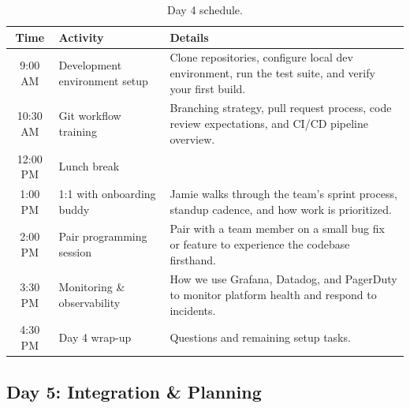 \documentclass[
    language=english,
    doctype=onboarding-guide,
    institution=none,
]{../../omnilatex}
\begin{document}
\begin{table}[h]
    \centering
    \begin{tabular}{clp{7cm}}
        \toprule
        \textbf{Time} & \textbf{Activity} & \textbf{Details} \\
        \midrule
        9:00 AM  & Development environment setup & Clone repositories, configure
            local dev environment, run the test suite, and verify your first
            build. \\
        10:30 AM & Git workflow training & Branching strategy, pull request
            process, code review expectations, and CI/CD pipeline overview. \\
        12:00 PM & Lunch break & \\
        1:00 PM  & 1:1 with onboarding buddy & Jamie walks through the team's
            sprint process, standup cadence, and how work is prioritized. \\
        2:00 PM  & Pair programming session & Pair with a team member on a
            small bug fix or feature to experience the codebase firsthand. \\
        3:30 PM  & Monitoring \& observability & How we use Grafana, Datadog,
            and PagerDuty to monitor platform health and respond to incidents. \\
        4:30 PM  & Day 4 wrap-up & Questions and remaining setup tasks. \\
        \bottomrule
    \end{tabular}
    \caption{Day 4 schedule.}
\end{table}

\subsection{Day 5: Integration \& Planning}
\end{document}
